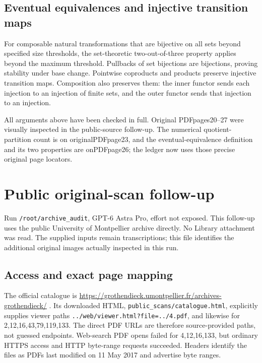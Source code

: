 \documentclass[
  10pt,
]{article}
\begin{document}
\subsection{Eventual equivalences and injective transition
maps}\label{eventual-equivalences-and-injective-transition-maps}

For composable natural transformations that are bijective on all sets
beyond specified size thresholds, the set-theoretic two-out-of-three
property applies beyond the maximum threshold. Pullbacks of set
bijections are bijections, proving stability under base change.
Pointwise coproducts and products preserve injective transition maps.
Composition also preserves them: the inner functor sends each injection
to an injection of finite sets, and the outer functor sends that
injection to an injection.

All arguments above have been checked in full. Original PDFpages20--27
were visually inspected in the public-source follow-up. The numerical
quotient-partition count is on originalPDFpage23, and the
eventual-equivalence definition and its two properties are onPDFpage26;
the ledger now uses those precise original page locators.

\section{Public original-scan
follow-up}\label{public-original-scan-follow-up}

Run
\texttt{\small /\allowbreak{}root/\allowbreak{}archive\_\allowbreak{}audit},
GPT-6 Astra Pro, effort not exposed. This follow-up uses the public
University of Montpellier archive directly. No Library attachment was
read. The supplied inputs remain transcriptions; this file identifies
the additional original images actually inspected in this run.

\subsection{Access and exact page
mapping}\label{access-and-exact-page-mapping}

The official catalogue is
\url{https://grothendieck.umontpellier.fr/archives-grothendieck/} . Its
downloaded HTML,
\texttt{\small public\_\allowbreak{}scans/\allowbreak{}catalogue.html},
explicitly supplies viewer paths
\texttt{\small ../\allowbreak{}web/\allowbreak{}viewer.html?file=\allowbreak{}../\allowbreak{}4.pdf},
and likewise for 2,12,16,43,79,119,133. The direct PDF URLs are
therefore source-provided paths, not guessed endpoints. Web-search PDF
opens failed for 4,12,16,133, but ordinary HTTPS access and HTTP
byte-range requests succeeded. Headers identify the files as PDFs last
modified on 11 May 2017 and advertise byte ranges.
\end{document}
